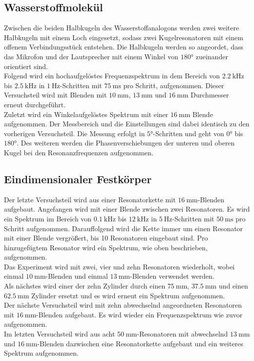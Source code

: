 \subsection{Wasserstoffmolekül}
Zwischen die beiden Halbkugeln des Wasserstoffanalogons werden zwei weitere Halbkugeln mit einem Loch eingesetzt, sodass zwei Kugelresonatoren mit einem offenem Verbindungsstück entstehen.
Die Halbkugeln werden so angeordet, dass das Mikrofon und der Lautsprecher mit einem Winkel von $\ang{180;;}$ zueinander orientiert sind.
\\
Folgend wird ein hochaufgelöstes Frequenzspektrum
in dem Bereich von $\SI{2.2}{\kilo\hertz}$ bis $\SI{2.5}{\kilo\hertz}$ in  $\SI{1}{\hertz}$-Schritten mit $\SI{75}{\milli\second}$ pro Schritt, aufgenommen.
Dieser Versuchsteil wird mit Blenden mit $\SI{10}{\milli\meter}$, $\SI{13}{\milli\meter}$ und $\SI{16}{\milli\meter}$ Durchmesser erneut durchgeführt.
\\
Zuletzt wird ein Winkelaufgelöstes Spektrum mit einer $\SI{16}{\milli\meter}$ Blende aufgenommen. Der Messbereich und die Einstellungen sind dabei identisch zu den vorherigen Versuchsteil.
Die Messung erfolgt in $\ang{5;;}$-Schritten und geht von $\ang{0;;}$ bis $\ang{180;;}$. Des weiteren werden die Phasenverschiebungen der unteren und oberen Kugel bei den Resonanzfrequenzen aufgenommen.

\subsection{Eindimensionaler Festkörper}
Der letzte Versuchsteil wird aus einer Resonatorkette mit $\SI{16}{\milli\meter}$-Blenden aufgebaut.
Angefangen wird mit einer Blende zwischen zwei Resonatoren. Es wird ein Spektrum im Bereich von
$\SI{0.1}{\kilo\hertz}$ bis $\SI{12}{\kilo\hertz}$ in $\SI{5}{\hertz}$-Schritten mit $\SI{50}{\milli\second}$ pro Schritt aufgenommen.
Darauffolgend wird die Kette immer um einen Resonator mit einer Blende vergrößert, bis 10 Resonatoren eingebaut sind. Pro hinzugefügtem Resonator wird ein Spektrum,
wie oben beschrieben, aufgenommen.
\\
Das Experiment wird mit zwei, vier und zehn Resonatoren wiederholt, wobei einmal $\SI{10}{\milli\meter}$-Blenden und einmal $\SI{13}{\milli\meter}$-Blenden
verwendet werden.
\\
Als nächstes wird einer der zehn Zylinder durch einen $\SI{75}{\milli\meter}$, $\SI{37.5}{\milli\meter}$ und einen $\SI{62.5}{\milli\meter}$ Zylinder ersetzt und
es wird erneut ein Spektrum aufgenommen.
\\
Der nächste Versuchsteil wird mit zehn abwechselnd angeordneten Resonatoren mit $\SI{16}{\milli\meter}$-Blenden aufgebaut.
Es wird wieder ein Frequenzspektrum wie zuvor aufgenommen.
\\
Im letzten Versuchsteil wird aus acht $\SI{50}{\milli\meter}$-Resonatoren mit abwechselnd $\SI{13}{\milli\meter}$ und $\SI{16}{\milli\meter}$-Blenden dazwischen
eine Resonatorkette aufgebaut und ein weiteres Spektrum aufgenommen.